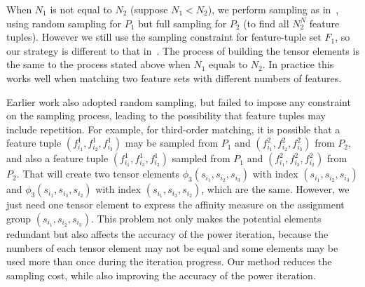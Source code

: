 When $N_1$ is not equal to $N_2$ (suppose $N_1<N_2$), we perform sampling as in~\cite{Duchenne_etal09}, using random sampling for $P_1$  but full sampling for $P_2$ (to find all $N_2^N$ feature tuples). However we still use the
sampling constraint for feature-tuple set $F_1$, so our strategy is
different to that in~\cite{Duchenne_etal09}. The process of building the tensor elements is the same to the process stated above when $N_1$ equals to $N_2$. In practice this works well when matching two feature sets with different numbers of features.

Earlier work \cite{Duchenne_etal09,Zass08} also adopted random sampling, but failed to impose any constraint on the sampling process,
leading to the possibility that feature tuples may include repetition.
For example, for third-order matching, it is possible that a feature tuple $(f_{i_1}^1, f_{i_2}^1, f_{i_3}^1)$ may be sampled from $P_1$ and $(f_{i_1}^2, f_{i_2}^2, f_{i_3}^2)$ from $P_2$, and also a feature tuple $(f_{i_1}^1, f_{i_3}^1, f_{i_2}^1)$ sampled from $P_1$ and $(f_{i_1}^2, f_{i_3}^2, f_{i_2}^2)$ from $P_2$. That will create two tensor elements $\phi_3(s_{i_1}, s_{i_2}, s_{i_3})$ with index $(s_{i_1}, s_{i_2}, s_{i_3})$ and $\phi_3(s_{i_1}, s_{i_3}, s_{i_2})$ with index $(s_{i_1}, s_{i_3}, s_{i_2})$, which are the same. However, we just need one tensor element to express the affinity measure on the assignment group $(s_{i_1}, s_{i_2}, s_{i_3})$. This problem not only makes the potential elements redundant but also affects the accuracy of the power iteration, because the numbers of each tensor element may not be equal and some elements may be used more than once during the iteration progress.
Our method reduces the sampling cost, while also improving the accuracy of the power iteration.
